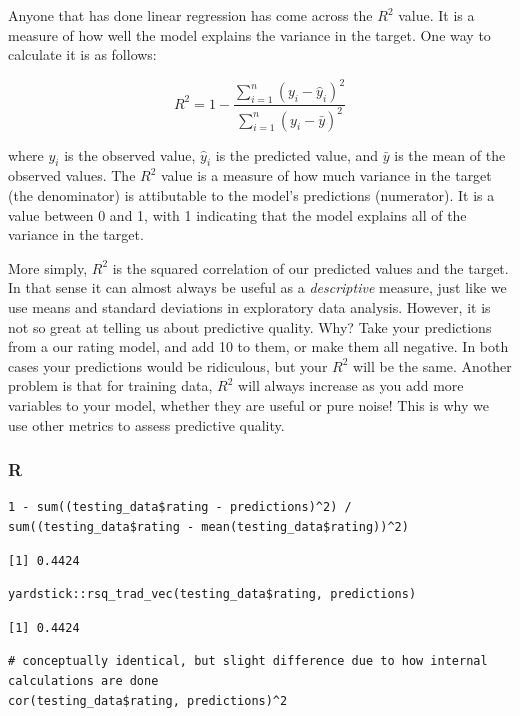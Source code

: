 \documentclass[
  letterpaper,
]{krantz}
\begin{document}
Anyone that has done linear regression has come across the \(R^2\)
value. It is a measure of how well the model explains the variance in
the target. One way to calculate it is as follows:

\[R^2 = 1 - \frac{\sum_{i=1}^{n}(y_i - \hat{y}_i)^2}{\sum_{i=1}^{n}(y_i - \bar{y})^2}\]

where \(y_i\) is the observed value, \(\hat{y}_i\) is the predicted
value, and \(\bar{y}\) is the mean of the observed values. The \(R^2\)
value is a measure of how much variance in the target (the denominator)
is attibutable to the model's predictions (numerator). It is a value
between 0 and 1, with 1 indicating that the model explains all of the
variance in the target.

More simply, \(R^2\) is the squared correlation of our predicted values
and the target. In that sense it can almost always be useful as a
\emph{descriptive} measure, just like we use means and standard
deviations in exploratory data analysis. However, it is not so great at
telling us about predictive quality. Why? Take your predictions from a
our rating model, and add 10 to them, or make them all negative. In both
cases your predictions would be ridiculous, but your \(R^2\) will be the
same. Another problem is that for training data, \(R^2\) will always
increase as you add more variables to your model, whether they are
useful or pure noise! This is why we use other metrics to assess
predictive quality.

\subsubsection{R}

\begin{verbatim}
1 - sum((testing_data$rating - predictions)^2) / sum((testing_data$rating - mean(testing_data$rating))^2)
\end{verbatim}

\begin{verbatim}
[1] 0.4424
\end{verbatim}

\begin{verbatim}
yardstick::rsq_trad_vec(testing_data$rating, predictions)
\end{verbatim}

\begin{verbatim}
[1] 0.4424
\end{verbatim}

\begin{verbatim}
# conceptually identical, but slight difference due to how internal calculations are done
cor(testing_data$rating, predictions)^2 
\end{verbatim}
\end{document}

